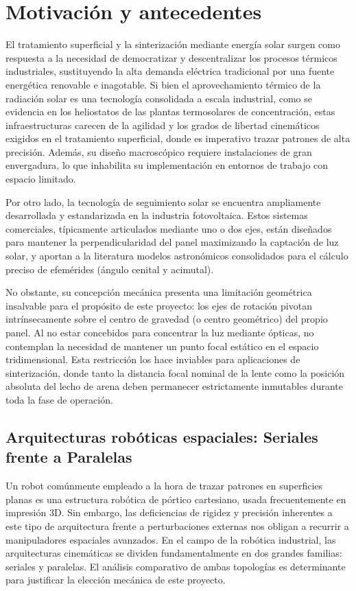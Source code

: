 \chapter{Motivación y antecedentes}
\label{ch:antecedentes}

El tratamiento superficial y la sinterización mediante energía solar surgen como respuesta a la necesidad de democratizar y descentralizar los procesos térmicos industriales, sustituyendo la alta demanda eléctrica tradicional por una fuente energética renovable e inagotable. Si bien el aprovechamiento térmico de la radiación solar es una tecnología consolidada a escala industrial, como se evidencia en los heliostatos de las plantas termosolares de concentración, estas infraestructuras carecen de la agilidad y los grados de libertad cinemáticos exigidos en el tratamiento superficial, donde es imperativo trazar patrones de alta precisión. Además, su diseño macroscópico requiere instalaciones de gran envergadura, lo que inhabilita su implementación en entornos de trabajo con espacio limitado.

Por otro lado, la tecnología de seguimiento solar se encuentra ampliamente desarrollada y estandarizada en la industria fotovoltaica. Estos sistemas comerciales, típicamente articulados mediante uno o dos ejes, están diseñados para mantener la perpendicularidad del panel maximizando la captación de luz solar, y aportan a la literatura modelos astronómicos consolidados para el cálculo preciso de efemérides (ángulo cenital y acimutal).

No obstante, su concepción mecánica presenta una limitación geométrica insalvable para el propósito de este proyecto: los ejes de rotación pivotan intrínsecamente sobre el centro de gravedad (o centro geométrico) del propio panel. Al no estar concebidos para concentrar la luz mediante ópticas, no contemplan la necesidad de mantener un punto focal estático en el espacio tridimensional. Esta restricción los hace inviables para aplicaciones de sinterización, donde tanto la distancia focal nominal de la lente como la posición absoluta del lecho de arena deben permanecer estrictamente inmutables durante toda la fase de operación.



\section{Arquitecturas robóticas espaciales: Seriales frente a Paralelas}

Un robot comúnmente empleado a la hora de trazar patrones en superficies planas es una estructura robótica de pórtico cartesiano, usada frecuentemente en impresión 3D. Sin embargo, las deficiencias de rigidez y precisión inherentes a este tipo de arquitectura frente a perturbaciones externas nos obligan a recurrir a manipuladores espaciales avanzados. En el campo de la robótica industrial, las arquitecturas cinemáticas se dividen fundamentalmente en dos grandes familias: seriales y paralelas. El análisis comparativo de ambas topologías es determinante para justificar la elección mecánica de este proyecto.

